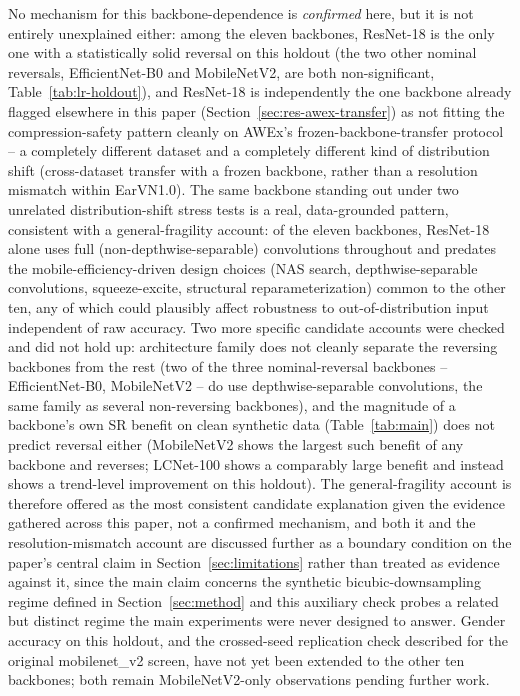 \documentclass[11pt]{article}
\begin{document}
No mechanism for this backbone-dependence is \emph{confirmed} here, but it is not entirely unexplained either: among the eleven backbones, ResNet-18 is the only one with a statistically solid reversal on this holdout (the two other nominal reversals, EfficientNet-B0 and MobileNetV2, are both non-significant, Table~\ref{tab:lr-holdout}), and ResNet-18 is independently the one backbone already flagged elsewhere in this paper (Section~\ref{sec:res-awex-transfer}) as not fitting the compression-safety pattern cleanly on AWEx's frozen-backbone-transfer protocol -- a completely different dataset and a completely different kind of distribution shift (cross-dataset transfer with a frozen backbone, rather than a resolution mismatch within EarVN1.0). The same backbone standing out under two unrelated distribution-shift stress tests is a real, data-grounded pattern, consistent with a general-fragility account: of the eleven backbones, ResNet-18 alone uses full (non-depthwise-separable) convolutions throughout and predates the mobile-efficiency-driven design choices (NAS search, depthwise-separable convolutions, squeeze-excite, structural reparameterization) common to the other ten, any of which could plausibly affect robustness to out-of-distribution input independent of raw accuracy. Two more specific candidate accounts were checked and did not hold up: architecture family does not cleanly separate the reversing backbones from the rest (two of the three nominal-reversal backbones -- EfficientNet-B0, MobileNetV2 -- do use depthwise-separable convolutions, the same family as several non-reversing backbones), and the magnitude of a backbone's own SR benefit on clean synthetic data (Table~\ref{tab:main}) does not predict reversal either (MobileNetV2 shows the largest such benefit of any backbone and reverses; LCNet-100 shows a comparably large benefit and instead shows a trend-level improvement on this holdout). The general-fragility account is therefore offered as the most consistent candidate explanation given the evidence gathered across this paper, not a confirmed mechanism, and both it and the resolution-mismatch account are discussed further as a boundary condition on the paper's central claim in Section~\ref{sec:limitations} rather than treated as evidence against it, since the main claim concerns the synthetic bicubic-downsampling regime defined in Section~\ref{sec:method} and this auxiliary check probes a related but distinct regime the main experiments were never designed to answer. Gender accuracy on this holdout, and the crossed-seed replication check described for the original mobilenet\_v2 screen, have not yet been extended to the other ten backbones; both remain MobileNetV2-only observations pending further work.
\end{document}
